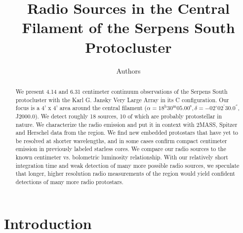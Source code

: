 \documentclass[apj]{emulateapj}
\begin{document}
\title{Radio Sources in the Central Filament of the Serpens South Protocluster}
\author{Authors}

\begin{abstract}

We present 4.14 and 6.31 centimeter continuum observations of the Serpens South protocluster with the Karl G. Jansky Very Large Array in its C configuration. Our focus is a 4' x 4' area around the central filament ($\alpha=18^{\text{h}}30^{\text{m}}05.00^{\text{s}}, \delta=-02^{\circ}02^{'}30.0^{''}$, J2000.0). We detect roughly 18 sources, 10 of which are probably protostellar in nature. We characterize the radio emission and put it in context with 2MASS, Spitzer and Herschel data from the region. We find new embedded protostars that have yet to be resolved at shorter wavelengths, and in some cases confirm compact centimeter emission in previously labeled starless cores. We compare our radio sources to the known centimeter vs. bolometric luminosity relationship. With our relatively short integration time and weak detection of many more possible radio sources, we speculate that longer, higher resolution radio measurements of the region would yield confident detections of many more radio protostars. 

\end{abstract}

\maketitle
\newpage


\section{Introduction}
\label{sec:introduction}
\end{document}
